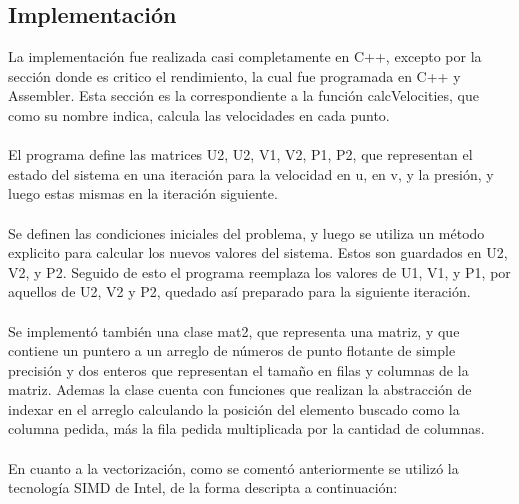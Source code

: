 \subsection{Implementación}
La implementación fue realizada casi completamente en C++, excepto por la sección donde es critico el rendimiento, la cual fue programada en C++ y Assembler. Esta sección es la correspondiente a la función calcVelocities, que como su nombre indica, calcula las velocidades en cada punto.
~\\
~\\
El programa define las matrices U2, U2, V1, V2, P1, P2, que representan el estado del sistema en una iteración para la velocidad en u, en v, y la presión, y luego estas mismas en la iteración siguiente. 
~\\
~\\
Se definen las condiciones iniciales del problema, y luego se utiliza un método explicito para calcular los nuevos valores del sistema. Estos son guardados en U2, V2, y P2. Seguido de esto el programa reemplaza los valores de U1, V1, y P1, por aquellos de U2, V2 y P2, quedado así preparado para la siguiente iteración. 
~\\
~\\
Se implementó también una clase mat2, que representa una matriz, y que contiene un puntero a un arreglo de números de punto flotante de simple precisión y dos enteros que representan el tamaño en filas y columnas de la matriz. Ademas la clase cuenta con funciones que realizan la abstracción de indexar en el arreglo calculando la posición del elemento buscado como la columna pedida, más la fila pedida multiplicada por la cantidad de columnas. 
~\\
~\\
En cuanto a la vectorización, como se comentó anteriormente se utilizó la tecnología SIMD de Intel, de la forma descripta a continuación:

